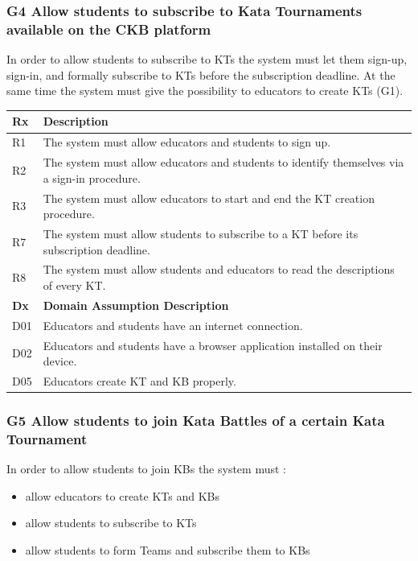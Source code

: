 \documentclass[11pt]{report}
\begin{document}
\subsubsection{G4 Allow students to subscribe to Kata Tournaments available on the CKB platform}
In order to allow students to subscribe to KTs the system must let them sign-up, sign-in, and formally subscribe to KTs 
before the subscription deadline. At the same time the system must give the possibility to educators to create KTs (G1).

\begin{longtable}[h] {|p{10mm} p{130mm}|}
\hline
\textbf{Rx} & \textbf{Description} \\ \hline
R1 & The system must allow educators and students to sign up. \\ 
R2 & The system must allow educators and students to identify themselves via a sign-in procedure. \\ 
R3 & The system must allow educators to start and end the KT creation procedure.\\
R7 & The system must allow students to subscribe to a KT before its subscription deadline. \\ 
R8 & The system must allow students and educators to read the descriptions of every KT. \\ 
\hline
\textbf{Dx} & \textbf{Domain Assumption Description} \\ \hline
D01 & Educators and students have an internet connection. \\ 
D02 & Educators and students have a browser application installed on their device.  \\ 
D05 & Educators create KT and KB properly.  \\ \hline
\end{longtable}


\subsubsection{G5 Allow students to join Kata Battles of a certain Kata Tournament}
In order to allow students to join KBs the system must : 
\begin{itemize}
    \item allow educators to create KTs and KBs
    \item allow students to subscribe to KTs
    \item allow students to form Teams and subscribe them to KBs
\end{itemize}
\end{document}
